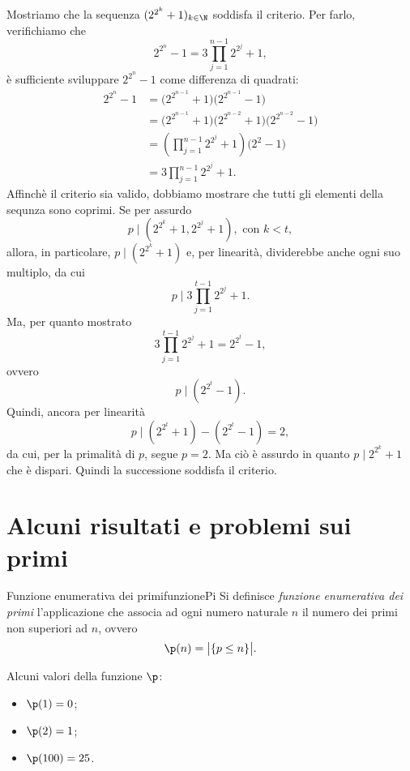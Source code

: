 \begin{ese}
	Mostriamo che la sequenza \((2^{2^k}+1)_{k\in\N}\) soddisfa il criterio.
	Per farlo, verifichiamo che
	\[
		2^{2^n}-1=3\prod_{j=1}^{n-1}2^{2^j}+1,
	\]
	è sufficiente sviluppare \(2^{2^n}-1\) come differenza di quadrati:
	\[
		\begin{split}
			2^{2^n}-1 & =\big(2^{2^{n-1}}+1\big)\big(2^{2^{n-1}}-1\big)\\
			& =\big(2^{2^{n-1}}+1\big)\big(2^{2^{n-2}}+1\big)\big(2^{2^{n-2}}-1\big)\\
			& =\left(\prod_{j=1}^{n-1}2^{2^j}+1\right)\big(2^2-1\big)\\
			& =3\prod_{j=1}^{n-1}2^{2^j}+1.
		\end{split}
	\]
	Affinchè il criterio sia valido, dobbiamo mostrare che tutti gli elementi della sequnza sono coprimi.
	Se per assurdo
	\[
		p\mid (2^{2^k}+1,2^{2^j}+1),\text{ con }k<t,
	\]
	allora, in particolare, \(p\mid(2^{2^k}+1)\) e, per linearità, dividerebbe anche ogni suo multiplo, da cui
	\[
		p\mid 3\prod_{j=1}^{t-1}2^{2^j}+1.
	\]
	Ma, per quanto mostrato
	\[
		3\prod_{j=1}^{t-1}2^{2^j}+1=2^{2^t}-1,
	\]
	ovvero
	\[
		p\mid (2^{2^t}-1).
	\]
	Quindi, ancora per linearità
	\[
		p\mid (2^{2^t}+1)-(2^{2^t}-1)=2,
	\]
	da cui, per la primalità di \(p\), segue \(p=2\).
	Ma ciò è assurdo in quanto \(p\mid 2^{2^k}+1\) che è dispari.
	Quindi la successione soddisfa il criterio.
\end{ese}
\section{Alcuni risultati e problemi sui primi}

\begin{defn}{Funzione enumerativa dei primi}{funzionePi}
	Si definisce \emph{funzione enumerativa dei primi} l'applicazione che associa ad ogni numero naturale \(n\) il numero dei primi non superiori ad \(n\), ovvero
	\[
		\p(n)=\big\lvert\{p\le n\}\big\rvert.
	\]
\end{defn}

\begin{ese}
	Alcuni valori della funzione \(\p\):
	\begin{itemize}
		\item \(\p(1)=0\);
		\item \(\p(2)=1\);
		\item \(\p(100)=25\).
	\end{itemize}
\end{ese}

